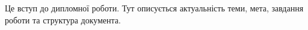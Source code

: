 Це вступ до дипломної роботи. Тут описується актуальність теми, мета, завдання роботи та структура документа.

